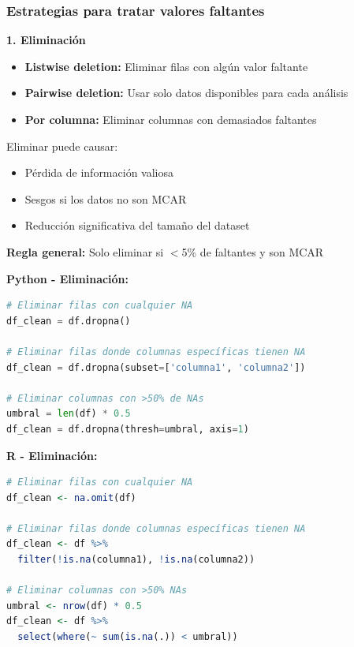 \documentclass[a4paper,11pt]{article}
\begin{document}
\subsubsection{Estrategias para tratar valores faltantes}

\textbf{1. Eliminación}

\begin{itemize}
    \item \textbf{Listwise deletion:} Eliminar filas con algún valor faltante
    \item \textbf{Pairwise deletion:} Usar solo datos disponibles para cada análisis
    \item \textbf{Por columna:} Eliminar columnas con demasiados faltantes
\end{itemize}

\begin{tcolorbox}[colback=advertenciacolor!20, colframe=red, title=Cuidado con la eliminación]
Eliminar puede causar:
\begin{itemize}
    \item Pérdida de información valiosa
    \item Sesgos si los datos no son MCAR
    \item Reducción significativa del tamaño del dataset
\end{itemize}

\textbf{Regla general:} Solo eliminar si $<$5\% de faltantes y son MCAR
\end{tcolorbox}

\textbf{Python - Eliminación:}
\begin{lstlisting}[language=Python]
# Eliminar filas con cualquier NA
df_clean = df.dropna()

# Eliminar filas donde columnas específicas tienen NA
df_clean = df.dropna(subset=['columna1', 'columna2'])

# Eliminar columnas con >50% de NAs
umbral = len(df) * 0.5
df_clean = df.dropna(thresh=umbral, axis=1)
\end{lstlisting}

\textbf{R - Eliminación:}
\begin{lstlisting}[language=R]
# Eliminar filas con cualquier NA
df_clean <- na.omit(df)

# Eliminar filas donde columnas específicas tienen NA
df_clean <- df %>%
  filter(!is.na(columna1), !is.na(columna2))

# Eliminar columnas con >50% NAs
umbral <- nrow(df) * 0.5
df_clean <- df %>%
  select(where(~ sum(is.na(.)) < umbral))
\end{lstlisting}
\end{document}
